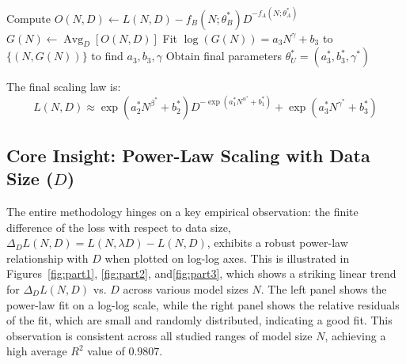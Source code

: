 \documentclass{article}
\begin{document}
\begin{algorithm}[!h]
    \BlankLine
    Compute $O(N,D) \leftarrow L(N,D) - f_B(N;\theta_B^*)D^{-f_A(N;\theta_A^*)}$\;
    $G(N) \leftarrow \operatorname*{Avg}_D[O(N,D)]$\;
    Fit $\log(G(N)) = a_3 N^\gamma + b_3$ to $\{ (N, G(N)) \}$ to find $a_3, b_3, \gamma$\;
    Obtain final parameters $\theta_U^*=(a_3^*,b_3^*,\gamma^*)$\;

    \BlankLine
    The final scaling law is: \;
    \[L(N,D) \approx \exp(a_2^* N^{\beta^*} + b_2^*)D^{-\exp(a_1^* N^{\alpha^*} + b_1^*)} + \exp(a_3^* N^{\gamma^*} + b_3^*)\]
    \;
\end{algorithm}

\newpage


\subsection{Core Insight: Power-Law Scaling with Data Size ($D$)}
\label{app:core_assumption}


The entire methodology hinges on a key empirical observation: the finite difference of the loss with respect to data size, $\Delta_D L(N,D) = L(N, \lambda D) - L(N, D)$, exhibits a robust power-law relationship with $D$ when plotted on log-log axes. This is illustrated in Figures~\ref{fig:part1}, \ref{fig:part2}, and\ref{fig:part3}, which shows a striking linear trend for $\Delta_D L(N,D)$ vs. $D$ across various model sizes $N$. The left panel shows the power-law fit on a log-log scale, while the right panel shows the relative residuals of the fit, which are small and randomly distributed, indicating a good fit. This observation is consistent across all studied ranges of model size $N$, achieving a high average $R^2$ value of $0.9807$.
\end{document}
